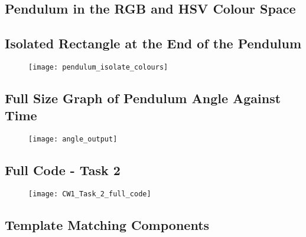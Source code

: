 \documentclass[conference]{IEEEtran}
\begin{document}
\begin{appendix}

\subsection{Pendulum in the RGB and HSV Colour Space}

\begin{figure}[H]
\centering
{}
\end{figure}

\label{appendix:pendulum_rgb_hsv_space}

\subsection{Isolated Rectangle at the End of the Pendulum}

\begin{figure}[H]
\centerline{\texttt{[image: pendulum\_isolate\_colours]}}
\end{figure}

\label{appendix:isolated_rectangle}

\subsection{Full Size Graph of Pendulum Angle Against Time}

\begin{figure}[H]
\centerline{\texttt{[image: angle\_output]}}
\end{figure}

\label{appendix:angle_output_full_size}

\subsection{Full Code - Task 2 }

\begin{figure}[H]
\centerline{\texttt{[image: CW1\_Task\_2\_full\_code]}}
\end{figure}

\label{appendix:task_2_full_code}

\subsection{Template Matching Components}


\end{appendix}
\end{document}
